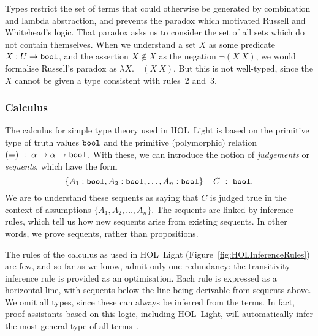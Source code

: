 Types restrict the set of terms that could otherwise be generated by combination and lambda abstraction, and prevents the paradox which motivated Russell and Whitehead's logic. That paradox asks us to consider the set of all sets which do not contain themselves. When we understand a set $X$ as some predicate $X:U \rightarrow \texttt{bool}$, and the assertion $X \not\in X$ as the negation $\neg(X\ X)$, we would formalise Russell's paradox as $\lambda X.\; \neg(X\ X)$. But this is not well-typed, since the $X$ cannot be given a type consistent with rules~2 and~3.

\subsubsection{Calculus}\label{sec:HOLInferenceRules}
The calculus for simple type theory used in HOL~Light is based on the primitive type of truth values $\texttt{bool}$ and the primitive (polymorphic) relation $(=)\ :\ \alpha \rightarrow \alpha \rightarrow \texttt{bool}$. With these, we can introduce the notion of \emph{judgements} or \emph{sequents}, which have the form
\begin{displaymath}
\{A_1:\texttt{bool},A_2:\texttt{bool},\ldots,A_n:\texttt{bool}\} \vdash C\ :\ \texttt{bool}.
\end{displaymath}
We are to understand these sequents as saying that $C$ is judged true in the context of assumptions $\{A_1,A_2,\ldots,A_n\}$. The sequents are linked by inference rules, which tell us how new sequents arise from existing sequents. In other words, we prove sequents, rather than propositions.

The rules of the calculus as used in HOL~Light (Figure~\ref{fig:HOLInferenceRules}) are few, and so far as we know, admit only one redundancy: the transitivity inference rule is provided as an optimisation. Each rule is expressed as a horizontal line, with sequents below the line being derivable from sequents above. We omit all types, since these can always be inferred from the terms. In fact, proof assistants based on this logic, including HOL~Light, will automatically infer the most general type of all terms~\cite{HindleyMilner}.

